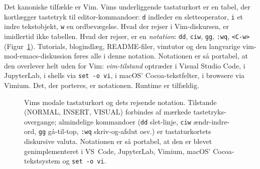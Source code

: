 \documentclass[10pt,letterpaper,twocolumn]{article}
\begin{document}
Det kanoniske tilfælde er Vim. Vims underliggende tastaturkort er en tabel, der kortlægger tastetryk til editor-kommandoer: \texttt{d} indleder en sletteoperator, \texttt{i} et indre tekstobjekt, \texttt{w} en ordbevægelse. Hvad der rejser i Vim-diskursen, er imidlertid ikke tabellen. Hvad der rejser, er en \emph{notation}: \texttt{dd}, \texttt{ciw}, \texttt{gg}, \texttt{:wq}, \texttt{<C-w>} (Figur~\ref{fig:vim-modes}). Tutorials, blogindlæg, README-filer, vimtutor og den langvarige vim-mod-emacs-diskussion føres alle i denne notation. Notationen er så portabel, at den overlever helt uden for Vim: \emph{vim-tilstand} optræder i Visual Studio Code, i JupyterLab, i shells via \texttt{set -o vi}, i macOS' Cocoa-tekstfelter, i browsere via Vimium. Det, der porteres, er notationen. Runtime er tilfældig.

\begin{figure}[t]
\centering
{}
\caption{Vims modale tastaturkort og dets rejsende notation. Tilstande (NORMAL, INSERT, VISUAL) forbindes af mærkede tastetryks-overgange; almindelige kommandoer (\texttt{dd} slet-linje, \texttt{ciw} ændr-indre-ord, \texttt{gg} gå-til-top, \texttt{:wq} skriv-og-afslut osv.) er tastaturkortets diskursive valuta. Notationen er så portabel, at den er blevet genimplementeret i VS~Code, JupyterLab, Vimium, macOS' Cocoa-tekstsystem og \texttt{set -o vi}.}
\label{fig:vim-modes}
\end{figure}
\end{document}
